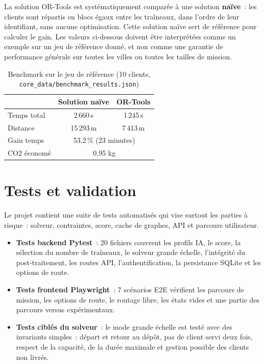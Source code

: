 \documentclass[a4paper, 12pt, twoside]{article}
\begin{document}
La solution OR-Tools est syst\'{e}matiquement compar\'{e}e \`{a} une solution \textbf{na\"ive}~:
les clients sont r\'{e}partis en blocs \'{e}gaux entre les tra\^{i}neaux, dans l'ordre de
leur identifiant, sans aucune optimisation. Cette solution na\"ive sert de r\'{e}f\'{e}rence
pour calculer le gain. Les valeurs ci-dessous doivent \^{e}tre interpr\'{e}t\'{e}es comme un
exemple sur un jeu de r\'{e}f\'{e}rence donn\'{e}, et non comme une garantie de performance
g\'{e}n\'{e}rale sur toutes les villes ou toutes les tailles de mission.

\begin{table}[h]
  \begin{center}
    \begin{tabular}{|l|c|c|}
      \hline
      & \textbf{Solution na\"ive} & \textbf{OR-Tools} \\
      \hline
      Temps total & 2\,660\,s & 1\,245\,s \\
      Distance & 15\,293\,m & 7\,413\,m \\
      Gain temps & \multicolumn{2}{c|}{53,2\,\% (23 minutes)} \\
      CO2 \'{e}conom\'{e} & \multicolumn{2}{c|}{0,95 kg} \\
      \hline
    \end{tabular}
  \end{center}
  \caption{Benchmark sur le jeu de r\'{e}f\'{e}rence (10 clients, \texttt{core\_data/benchmark\_results.json})}
  \label{tab:benchmark}
\end{table}

\section{Tests et validation}

Le projet contient une suite de tests automatis\'{e}s qui vise surtout les parties \`{a} risque~:
solveur, contraintes, score, cache de graphes, API et parcours utilisateur.

\begin{itemize}
  \item \textbf{Tests backend Pytest}~: 20 fichiers couvrent les profils IA, le score,
        la s\'{e}lection du nombre de tra\^{i}neaux, le solveur grande \'{e}chelle,
        l'int\'{e}grit\'{e} du post-traitement, les routes API, l'authentification,
        la persistance SQLite et les options de route.
  \item \textbf{Tests frontend Playwright}~: 7 sc\'{e}narios E2E v\'{e}rifient les parcours
        de mission, les options de route, le routage libre, les \'{e}tats vides et une partie
        des parcours versus exp\'{e}rimentaux.
  \item \textbf{Tests cibl\'{e}s du solveur}~: le mode grande \'{e}chelle est test\'{e} avec
        des invariants simples~: d\'{e}part et retour au d\'{e}p\^{o}t, pas de client servi
        deux fois, respect de la capacit\'{e}, de la dur\'{e}e maximale et gestion possible
        des clients non livr\'{e}s.
\end{itemize}
\end{document}
